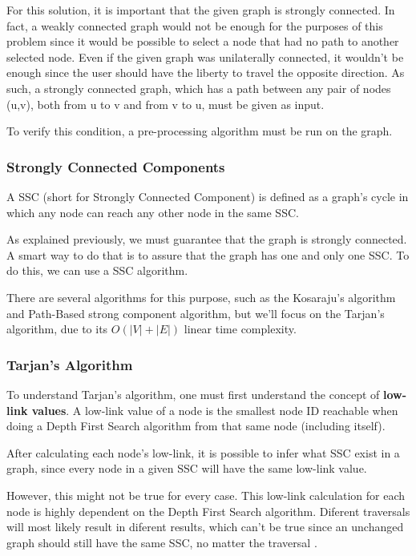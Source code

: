 \documentclass[a4paper, 12pt]{report}
\begin{document}
    For this solution, it is important that the given graph is strongly connected. In fact, a weakly connected graph would not be enough for the purposes of this problem since it would be possible to select a node that had no path to another selected node. Even if the given graph was unilaterally connected, it wouldn't be enough since the user should have the liberty to travel the opposite direction. As such, a strongly connected graph, which has a path between any pair of nodes (u,v), both from u to v and from v to u, must be given as input.
    
    To verify this condition, a pre-processing algorithm must be run on the graph.
    
    \subsubsection{Strongly Connected Components}
    
    A SSC (short for Strongly Connected Component) is defined as a graph's cycle in which any node can reach any other node in the same SSC.
    
    As explained previously, we must guarantee that the graph is strongly connected. A smart way to do that is to assure that the graph has one and only one SSC. To do this, we can use a SSC algorithm.
    
    There are several algorithms for this purpose, such as the Kosaraju's algorithm and Path-Based strong component algorithm, but we'll focus on the Tarjan's algorithm, due to its $O(|V|+|E|)$ linear time complexity.
    
    \subsubsection{Tarjan's Algorithm}
    
    To understand Tarjan's algorithm, one must first understand the concept of \textbf{low-link values}. A low-link value of a node is the smallest node ID reachable when doing a Depth First Search algorithm from that same node (including itself).
    
    After calculating each node's low-link, it is possible to infer what SSC exist in a graph, since every node in a given SSC will have the same low-link value.
    
    However, this might not be true for every case. This low-link calculation for each node is highly dependent on the Depth First Search algorithm. Diferent traversals will most likely result in diferent results, which can't be true since an unchanged graph should still have the same SSC, no matter the traversal \cite{tarjan}.
    
\end{document}

